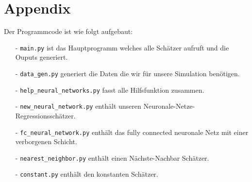 \chapter*{Appendix}
\label{chap:app}

Der Programmcode ist wie folgt aufgebaut:
\begin{itemize}
    \item[-] \texttt{main.py} ist das Hauptprogramm welches alle Schätzer aufruft und die Ouputs generiert.
    \item[-] \texttt{data\_gen.py} generiert die Daten die wir für unsere Simulation benötigen.
    \item[-] \texttt{help\_neural\_networks.py} fasst alle Hilfsfunktion zusammen.
    \item[-] \texttt{new\_neural\_network.py} enthält unseren Neuronale-Netze-Regressionsschätzer.
    \item[-] \texttt{fc\_neural\_network.py} enthält das fully connected neuronale Netz mit einer verborgenen Schicht.
    \item[-] \texttt{nearest\_neighbor.py} enthält einen Nächste-Nachbar Schätzer.
    \item[-] \texttt{constant.py} enthält den konstanten Schätzer.
\end{itemize}
\renewcommand\lstlistingname{Listing}







